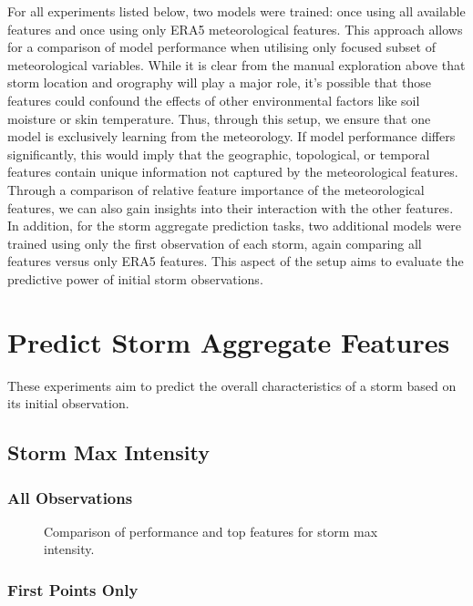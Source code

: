 For all experiments listed below, two models were trained: once using all available features and once using only ERA5 meteorological features. This approach allows for a comparison of model performance when utilising only focused subset of meteorological variables. While it is clear from the manual exploration above that storm location and orography will play a major role, it's possible that those features could confound the effects of other environmental factors like soil moisture or skin temperature. Thus, through this setup, we ensure that one model is exclusively learning from the meteorology. If model performance differs significantly, this would imply that the geographic, topological, or temporal features contain unique information not captured by the meteorological features. Through a comparison of relative feature importance of the meteorological features, we can also gain insights into their interaction with the other features. In addition, for the storm aggregate prediction tasks, two additional models were trained using only the first observation of each storm, again comparing all features versus only ERA5 features. This aspect of the setup aims to evaluate the predictive power of initial storm observations.

\section{Predict Storm Aggregate Features}

These experiments aim to predict the overall characteristics of a storm based on its initial observation.

\subsection{Storm Max Intensity}

\subsubsection{All Observations}

\begin{figure}[h]
    \centering
    \caption{Comparison of performance and top features for storm max intensity.}
    \label{fig:storm_max_intensity_summary}
\end{figure}

\subsubsection{First Points Only}

